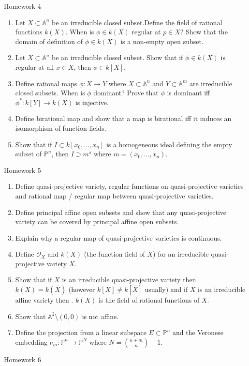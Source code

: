 \documentclass[12pt]{amsart}
\begin{document}
\centerline{Homework 4}
\begin{enumerate}
\item Let $X\subset \mathbb A ^n$ be an irreducible closed subset.Define the field of rational functions $k(X)$. When is $\phi\in k(X)$ regular at $p\in X$? Show that the domain of definition of  $\phi\in k(X)$ is a non-empty open subset.
\item Let $X\subset \mathbb A ^n$ be an irreducible closed subset. Show that if $\phi \in k(X)$ is regular at all $x\in X$, then $\phi \in k[X]$.
\item Define rational maps $\phi:X\to Y$ where $X\subset \mathbb A ^n$ and $Y\subset \mathbb A^m$ are irreducible closed subsets. When is $\phi$ dominant?
Prove that $\phi $ is dominant iff $\phi ^*:k[Y]\to k(X)$ is injective.
\item Define birational map and show that a map is birational iff it induces an isomorphism of function fields.
\item Show that if $I\subset k[x_0,\ldots , x_n]$ is a homogeneous ideal defining the empty subset of $\mathbb P ^n$, then $I\supset m^s$ where $m=(x_0,\ldots , x_n)$.\end{enumerate}
\centerline{Homework 5}
\begin{enumerate}
\item Define quasi-projective variety, regular functions on quasi-projective varieties and rational map / regular map between quasi-projective varieties.
\item Define principal affine open subsets and show that any quasi-projective variety can be covered by  principal affine open subsets.
\item Explain why a regular map of quasi-projective varieties is continuous.
\item Define $\mathcal O _X$ and $k(X)$ (the function field of $X$) for an irreducible quasi-projective variety $X$.
\item Show that if $X$ is an irreducible quasi-projective variety then $k(X)=k(\bar X)$ (however $k[X]\ne k[\bar X]$ usually) and if $X$ is an irreducible affine variety then . $k(X)$ is the field of rational functions of $X$.
\item Show that $\mathbb A ^2\setminus (0,0)$ is not affine.
\item Define the projection from a linear subspace $E\subset \mathbb P ^n$ and the Veronese embedding $\nu _m:\mathbb P^n\to \mathbb P ^N$ where $N=\binom {n+m}n -1$.
\end{enumerate}
\centerline{Homework 6}
\end{document}
